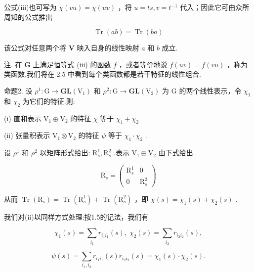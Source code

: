 公式(iii)也可写为 \(\chi \left( {vu}\right)  = \chi \left( {uv}\right)\) ，将 \(u = {ts},v = {t}^{-1}\) 代入；因此它可由众所周知的公式推出

\[
\operatorname{Tr}\left( {ab}\right)  = \operatorname{Tr}\left( {ba}\right)
\]

该公式对任意两个将 \(\mathbf{V}\) 映入自身的线性映射 \(a\) 和 \(b\) 成立.

注. 在 \(\mathbf{G}\) 上满足恒等式 (iii) 的函数 \(f\) ，或者等价地说 \(f\left( {uv}\right)  = f\left( {vu}\right)\) ，称为类函数.我们将在 2.5 中看到每个类函数都是若干特征的线性组合.

命题2. 设 \({\rho }^{1} : \mathrm{G} \rightarrow  \mathbf{{GL}}\left( {\mathrm{V}}_{1}\right)\) 和 \({\rho }^{2} : \mathrm{G} \rightarrow  \mathbf{{GL}}\left( {\mathrm{V}}_{2}\right)\) 为 \(\mathrm{G}\) 的两个线性表示，令 \({\chi }_{1}\) 和 \({\chi }_{2}\) 为它们的特征.则:

(i) 直和表示 \({\mathrm{V}}_{1} \oplus  {\mathrm{V}}_{2}\) 的特征 \(\chi\) 等于 \({\chi }_{1} + {\chi }_{2}\)

(ii) 张量积表示 \({\mathrm{V}}_{1} \otimes  {\mathrm{V}}_{2}\) 的特征 \(\psi\) 等于 \({\chi }_{1} \cdot  {\chi }_{2}\) .

设 \({\rho }^{1}\) 和 \({\rho }^{2}\) 以矩阵形式给出: \({\mathrm{R}}_{s}^{1},{\mathrm{R}}_{s}^{2}\) .表示 \({\mathrm{V}}_{1} \oplus  {\mathrm{V}}_{2}\) 由下式给出

\[
{\mathrm{R}}_{s} = \left( \begin{matrix} {\mathrm{R}}_{s}^{1} & 0 \\  0 & {\mathrm{R}}_{s}^{2} \end{matrix}\right)
\]

从而 \(\operatorname{Tr}\left( {\mathrm{R}}_{s}\right)  = \operatorname{Tr}\left( {\mathrm{R}}_{s}^{1}\right)  + \operatorname{Tr}\left( {\mathrm{R}}_{s}^{2}\right)\) ，即 \(\chi \left( s\right)  = {\chi }_{1}\left( s\right)  + {\chi }_{2}\left( s\right)\) .

我们对(ii)以同样方式处理:按1.5的记法，我们有

\[
{\chi }_{1}\left( s\right)  = \mathop{\sum }\limits_{{i}_{1}}{r}_{{i}_{1}{i}_{1}}\left( s\right) ,\;{\chi }_{2}\left( s\right)  = \mathop{\sum }\limits_{{i}_{2}}{r}_{{i}_{2}{i}_{2}}\left( s\right) ,
\]

\[
\psi \left( s\right)  = \mathop{\sum }\limits_{{{i}_{1},{i}_{2}}}{r}_{{i}_{1}{i}_{1}}\left( s\right) {r}_{{i}_{2}{i}_{2}}\left( s\right)  = {\chi }_{1}\left( s\right)  \cdot  {\chi }_{2}\left( s\right) .
\]

